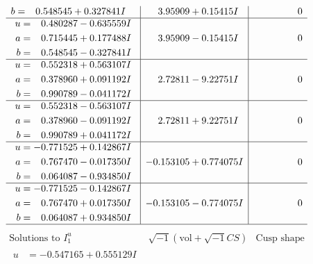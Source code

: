 \documentclass[1p]{elsarticle_modified}
\theoremstyle{definition}
\newcommand{\I}{\sqrt{-1}}
\begin{document}
$$\begin{array}{c|c|c}
\begin{aligned}
b &= \phantom{-}0.548545 + 0.327841 I\end{aligned}
 & \phantom{-}3.95909 + 0.15415 I & \phantom{-0.000000 } 0 \\ \hline\begin{aligned}
u &= \phantom{-}0.480287 - 0.635559 I \\
a &= \phantom{-}0.715445 + 0.177488 I \\
b &= \phantom{-}0.548545 - 0.327841 I\end{aligned}
 & \phantom{-}3.95909 - 0.15415 I & \phantom{-0.000000 } 0 \\ \hline\begin{aligned}
u &= \phantom{-}0.552318 + 0.563107 I \\
a &= \phantom{-}0.378960 + 0.091192 I \\
b &= \phantom{-}0.990789 - 0.041172 I\end{aligned}
 & \phantom{-}2.72811 - 9.22751 I & \phantom{-0.000000 } 0 \\ \hline\begin{aligned}
u &= \phantom{-}0.552318 - 0.563107 I \\
a &= \phantom{-}0.378960 - 0.091192 I \\
b &= \phantom{-}0.990789 + 0.041172 I\end{aligned}
 & \phantom{-}2.72811 + 9.22751 I & \phantom{-0.000000 } 0 \\ \hline\begin{aligned}
u &= -0.771525 + 0.142867 I \\
a &= \phantom{-}0.767470 - 0.017350 I \\
b &= \phantom{-}0.064087 - 0.934850 I\end{aligned}
 & -0.153105 + 0.774075 I & \phantom{-0.000000 } 0 \\ \hline\begin{aligned}
u &= -0.771525 - 0.142867 I \\
a &= \phantom{-}0.767470 + 0.017350 I \\
b &= \phantom{-}0.064087 + 0.934850 I\end{aligned}
 & -0.153105 - 0.774075 I & \phantom{-0.000000 } 0\\
 \hline 
 \end{array}$$\newpage$$\begin{array}{c|c|c}  
\text{Solutions to }I^u_{1}& \I (\text{vol} + \sqrt{-1}CS) & \text{Cusp shape}\\
 \hline 
\begin{aligned}
u &= -0.547165 + 0.555129 I \\

\end{aligned}
\end{array}$$
\end{document}

